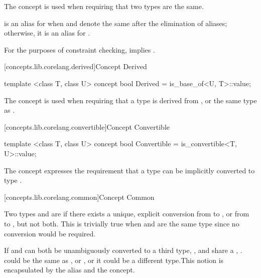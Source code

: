 \begin{addedblock}
\begin{itemdescr}
{\color{oldclr}
\pnum
The  concept is used when requiring that two types are the same.
}

\pnum
{} is an alias for  when  and 
denote the same  after the elimination of aliases; otherwise, it is an alias for
.

\pnum
\remarks For the purposes of constraint checking,  implies
.
\end{itemdescr}

[concepts.lib.corelang.derived]{Concept Derived}

%
\begin{itemdecl}
template <class T, class U>
concept bool Derived = is_base_of<U, T>::value;
\end{itemdecl}

\begin{itemdescr}
{\color{oldclr}
\pnum
The  concept is used when requiring that a type  is derived
from , or the same type as .
}
\end{itemdescr}

[concepts.lib.corelang.convertible]{Concept Convertible}

%
\begin{itemdecl}
template <class T, class U>
concept bool Convertible = is_convertible<T, U>::value;
\end{itemdecl}

\begin{itemdescr}
{\color{oldclr}
\pnum
The  concept expresses the requirement that a type
 can be implicitly converted to type .
}
\end{itemdescr}

[concepts.lib.corelang.common]{Concept Common}

\pnum
Two types  and  are  if
there exists a unique, explicit conversion from  to , or from
 to , but not both. \enternote This is trivially true
when  and  are the same type since no conversion would be
required.\exitnote

\pnum
If  and  can both be unambiguously converted to a third type,
,  and  share a ,
. \enternote {} could be the same as , or , or
it could be a different type.\exitnote This notion is encapsulated by the
 alias and the  concept.


\end{addedblock}
